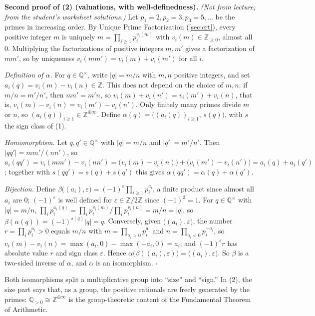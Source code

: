 \documentclass[11pt]{report}
\renewenvironment{proof}[1][Proof]{\noindent\textbf{#1.} }{\hfill$\square$\par\vspace{5pt}}
\begin{document}
\begin{proof}[Second proof of (2) (valuations, with well-definedness)]
\textit{(Not from lecture; from the student's worksheet solutions.)} Let $p_1 = 2, p_2 = 3, p_3 = 5, \ldots$ be the primes in increasing order. By Unique Prime Factorization (\ref{sec:crt}), every positive integer $m$ is uniquely $m = \prod_{i \geq 1} p_i^{v_i(m)}$ with $v_i(m) \in \mathbb{Z}_{\geq 0}$, almost all $0$. Multiplying the factorizations of positive integers $m, m'$ gives a factorization of $mm'$, so by uniqueness $v_i(mm') = v_i(m) + v_i(m')$ for all $i$.

\emph{Definition of $\alpha$.} For $q \in \mathbb{Q}^\times$, write $|q| = m/n$ with $m, n$ positive integers, and set $a_i(q) = v_i(m) - v_i(n) \in \mathbb{Z}$. This does not depend on the choice of $m, n$: if $m/n = m'/n'$, then $mn' = m'n$, so $v_i(m) + v_i(n') = v_i(m') + v_i(n)$, that is, $v_i(m) - v_i(n) = v_i(m') - v_i(n')$. Only finitely many primes divide $m$ or $n$, so $(a_i(q))_{i \geq 1} \in \mathbb{Z}^{\oplus\infty}$. Define $\alpha(q) = \big((a_i(q))_{i \geq 1},\, s(q)\big)$, with $s$ the sign class of (1).

\emph{Homomorphism.} Let $q, q' \in \mathbb{Q}^\times$ with $|q| = m/n$ and $|q'| = m'/n'$. Then $|qq'| = mm'/(nn')$, so $a_i(qq') = v_i(mm') - v_i(nn') = \big(v_i(m) - v_i(n)\big) + \big(v_i(m') - v_i(n')\big) = a_i(q) + a_i(q')$; together with $s(qq') = s(q) + s(q')$ this gives $\alpha(qq') = \alpha(q) + \alpha(q')$.

\emph{Bijection.} Define $\beta\big((a_i), \varepsilon\big) = (-1)^\varepsilon \prod_{i \geq 1} p_i^{a_i}$, a finite product since almost all $a_i$ are $0$; $(-1)^\varepsilon$ is well defined for $\varepsilon \in \mathbb{Z}/2\mathbb{Z}$ since $(-1)^2 = 1$. For $q \in \mathbb{Q}^\times$ with $|q| = m/n$, $\prod_i p_i^{a_i(q)} = \prod_i p_i^{v_i(m)} \big/ \prod_i p_i^{v_i(n)} = m/n = |q|$, so $\beta(\alpha(q)) = (-1)^{s(q)}|q| = q$. Conversely, given $\big((a_i), \varepsilon\big)$, the number $r = \prod_i p_i^{a_i} > 0$ equals $m/n$ with $m = \prod_{a_i > 0} p_i^{a_i}$ and $n = \prod_{a_i < 0} p_i^{-a_i}$, so $v_i(m) - v_i(n) = \max(a_i, 0) - \max(-a_i, 0) = a_i$; and $(-1)^\varepsilon r$ has absolute value $r$ and sign class $\varepsilon$. Hence $\alpha\big(\beta((a_i), \varepsilon)\big) = \big((a_i), \varepsilon\big)$. So $\beta$ is a two-sided inverse of $\alpha$, and $\alpha$ is an isomorphism.
\end{proof}

\begin{rembox}[Interpretation]\label{rem:interpretation}
Both isomorphisms split a multiplicative group into ``size'' and ``sign.'' In (2), the size part says that, as a group, the positive rationals are freely generated by the primes: $\mathbb{Q}_{>0} \cong \mathbb{Z}^{\oplus\infty}$ is the group-theoretic content of the Fundamental Theorem of Arithmetic.
\end{rembox}
\end{document}
